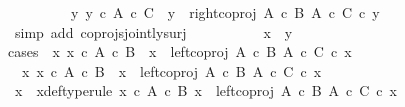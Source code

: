 \begin{isabellebody}
\ \ \ \ \ \ {\isasymor}\ \ {\isacharparenleft}{\kern0pt}{\isasymexists}\ y{\isacharprime}{\kern0pt}{\isachardot}{\kern0pt}\ y{\isacharprime}{\kern0pt}\ {\isasymin}\isactrlsub c\ A\ {\isasymtimes}\isactrlsub c\ C\ {\isasymand}\ y\ {\isacharequal}{\kern0pt}\ {\isacharparenleft}{\kern0pt}right{\isacharunderscore}{\kern0pt}coproj\ {\isacharparenleft}{\kern0pt}A\ {\isasymtimes}\isactrlsub c\ B{\isacharparenright}{\kern0pt}\ {\isacharparenleft}{\kern0pt}A\ {\isasymtimes}\isactrlsub c\ C{\isacharparenright}{\kern0pt}{\isacharparenright}{\kern0pt}\ {\isasymcirc}\isactrlsub c\ y{\isacharprime}{\kern0pt}{\isacharparenright}{\kern0pt}{\isachardoublequoteclose}\isanewline
\ \ \ \ \ \ \isamarkupfalse%
\ {\isacharparenleft}{\kern0pt}simp\ add{\isacharcolon}{\kern0pt}\ coprojs{\isacharunderscore}{\kern0pt}jointly{\isacharunderscore}{\kern0pt}surj{\isacharparenright}{\kern0pt}\isanewline
\ \ \ \ \isanewline
\ \ \ \ \isamarkupfalse%
\ {\isachardoublequoteopen}x\ {\isacharequal}{\kern0pt}\ y{\isachardoublequoteclose}\ \isanewline
\ \ \ \ \isamarkupfalse%
{\isacharparenleft}{\kern0pt}cases\ {\isachardoublequoteopen}{\isacharparenleft}{\kern0pt}{\isasymexists}\ x{\isacharprime}{\kern0pt}{\isachardot}{\kern0pt}\ x{\isacharprime}{\kern0pt}\ {\isasymin}\isactrlsub c\ A\ {\isasymtimes}\isactrlsub c\ B\ {\isasymand}\ x\ {\isacharequal}{\kern0pt}\ {\isacharparenleft}{\kern0pt}left{\isacharunderscore}{\kern0pt}coproj\ {\isacharparenleft}{\kern0pt}A\ {\isasymtimes}\isactrlsub c\ B{\isacharparenright}{\kern0pt}\ {\isacharparenleft}{\kern0pt}A\ {\isasymtimes}\isactrlsub c\ C{\isacharparenright}{\kern0pt}{\isacharparenright}{\kern0pt}\ {\isasymcirc}\isactrlsub c\ x{\isacharprime}{\kern0pt}{\isacharparenright}{\kern0pt}{\isachardoublequoteclose}{\isacharparenright}{\kern0pt}\isanewline
\ \ \ \ \ \ \isamarkupfalse%
\ {\isachardoublequoteopen}{\isasymexists}\ x{\isacharprime}{\kern0pt}{\isachardot}{\kern0pt}\ x{\isacharprime}{\kern0pt}\ {\isasymin}\isactrlsub c\ A\ {\isasymtimes}\isactrlsub c\ B\ {\isasymand}\ x\ {\isacharequal}{\kern0pt}\ {\isacharparenleft}{\kern0pt}left{\isacharunderscore}{\kern0pt}coproj\ {\isacharparenleft}{\kern0pt}A\ {\isasymtimes}\isactrlsub c\ B{\isacharparenright}{\kern0pt}\ {\isacharparenleft}{\kern0pt}A\ {\isasymtimes}\isactrlsub c\ C{\isacharparenright}{\kern0pt}{\isacharparenright}{\kern0pt}\ {\isasymcirc}\isactrlsub c\ x{\isacharprime}{\kern0pt}{\isachardoublequoteclose}\isanewline
\ \ \ \ \ \ \isamarkupfalse%
\ \isamarkupfalse%
\ x{\isacharprime}{\kern0pt}\ \ x{\isacharprime}{\kern0pt}{\isacharunderscore}{\kern0pt}def{\isacharbrackleft}{\kern0pt}type{\isacharunderscore}{\kern0pt}rule{\isacharbrackright}{\kern0pt}{\isacharcolon}{\kern0pt}\ {\isachardoublequoteopen}x{\isacharprime}{\kern0pt}\ {\isasymin}\isactrlsub c\ A\ {\isasymtimes}\isactrlsub c\ B{\isachardoublequoteclose}\ {\isachardoublequoteopen}x\ {\isacharequal}{\kern0pt}\ left{\isacharunderscore}{\kern0pt}coproj\ {\isacharparenleft}{\kern0pt}A\ {\isasymtimes}\isactrlsub c\ B{\isacharparenright}{\kern0pt}\ {\isacharparenleft}{\kern0pt}A\ {\isasymtimes}\isactrlsub c\ C{\isacharparenright}{\kern0pt}\ {\isasymcirc}\isactrlsub c\ x{\isacharprime}{\kern0pt}{\isachardoublequoteclose}\isanewline

\end{isabellebody}
